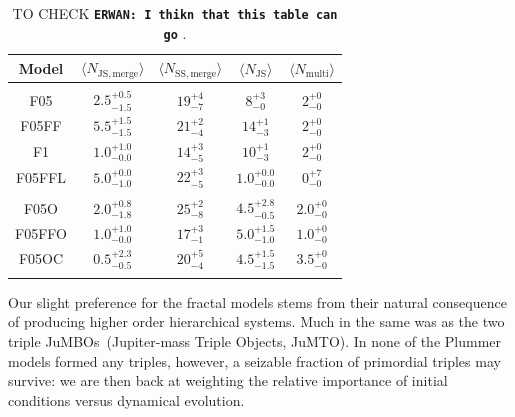 \documentclass[submission,phys]{lib/SciPost}
\newcommand{\erwan}[1] {{\texttt{\textbf{ERWAN: #1}}} }
\newcommand{\jumbos}{\mbox{JuMBOs}}
\begin{document}
    \begin{table}
      \caption{TO CHECK \erwan{I thikn that this table can go}.
       }
        \label{Tab:M2Events} 
        \centering 
        \begin{tabular}{c c c c c}
        \hline\hline
        Model & $\langle N_{\mathrm{JS, merge}}\rangle$ & $\langle N_{\mathrm{SS, merge}}\rangle$ & $\langle N_{\mathrm{JS}}\rangle$ &  $\langle N_{\mathrm{multi}} \rangle$ \\
        \hline \vspace{-0.75em}\\ 
           F05     & $2.5^{+0.5}_{-1.5}$ & $19^{+4}_{-7}$ & $8^{+3}_{-0}$  & $2^{+0}_{-0}$ \vspace{0.25em}\\
           F05FF   & $5.5^{+1.5}_{-1.5}$ & $21^{+2}_{-4}$ & $14^{+1}_{-3}$ & $2^{+0}_{-0}$ \vspace{0.25em}\\
           F1      & $1.0^{+1.0}_{-0.0}$ & $14^{+3}_{-5}$ & $10^{+1}_{-3}$ & $2^{+0}_{-0}$ \vspace{0.25em}\\
           F05FFL  & $5.0^{+0.0}_{-1.0}$ & $22^{+3}_{-5}$ & $1.0^{+0.0}_{-0.0}$ & $0^{+7}_{-0}$ \vspace{0.25em}\\
           \hline \vspace{-0.75em}\\
           F05O    & $2.0^{+0.8}_{-1.8}$ & $25^{+2}_{-8}$ & $4.5^{+2.8}_{-0.5}$ & $2.0^{+0}_{-0}$ \vspace{0.25em}\\
           F05FFO  & $1.0^{+1.0}_{-0.0}$ & $17^{+3}_{-1}$ & $5.0^{+1.5}_{-1.0}$ & $1.0^{+0}_{-0}$ \vspace{0.25em}\\
           F05OC   & $0.5^{+2.3}_{-0.5}$ & $20^{+5}_{-4}$ & $4.5^{+1.5}_{-1.5}$ & $3.5^{+0}_{-0}$ \vspace{0.25em}\\
           \hline
         \hline                               %
         \label{Tab:Systems}
        \end{tabular}
     \end{table}

Our slight preference for the fractal models stems from their natural
consequence of producing higher order hierarchical systems. Much in
the same was as the two triple \jumbos\, (Jupiter-mass Triple Objects,
JuMTO). In none of the Plummer models formed any triples, however, a
seizable fraction of primordial triples may survive: we are then back
at weighting the relative importance of initial conditions versus
dynamical evolution.
\end{document}
